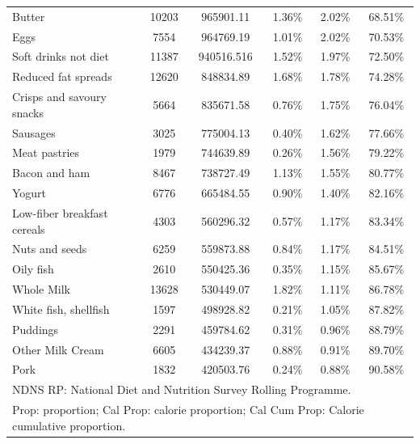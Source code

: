 \documentclass[utf8]{frontiersSCNS}
\providecommand{\DIFaddendFL}{} %
\DeclareRobustCommand{\DIFaddendFL}{\DIFOaddendFL \let\includegraphics\DIFOincludegraphics} %
\begin{document}
\begin{table}[h!]
{\begin{tabular}{lccccc}
        Butter                                              & 10203 & 965901.11  & 1.36\%        & 2.02\%   & 68.51\%      \\
        Eggs                                                & 7554  & 964769.19  & 1.01\%        & 2.02\%   & 70.53\%      \\
        Soft drinks not diet                                & 11387 & 940516.516 & 1.52\%        & 1.97\%   & 72.50\%      \\
        Reduced fat spreads                                 & 12620 & 848834.89  & 1.68\%        & 1.78\%   & 74.28\%      \\
        Crisps and savoury snacks                           & 5664  & 835671.58  & 0.76\%        & 1.75\%   & 76.04\%      \\
        Sausages                                            & 3025  & 775004.13  & 0.40\%        & 1.62\%   & 77.66\%      \\
        Meat pastries                                       & 1979  & 744639.89  & 0.26\%        & 1.56\%   & 79.22\%      \\
        Bacon and ham                                       & 8467  & 738727.49  & 1.13\%        & 1.55\%   & 80.77\%      \\
        Yogurt                                              & 6776  & 665484.55  & 0.90\%        & 1.40\%   & 82.16\%      \\
        Low-fiber breakfast cereals                         & 4303  & 560296.32  & 0.57\%        & 1.17\%   & 83.34\%      \\
        Nuts and seeds                                      & 6259  & 559873.88  & 0.84\%        & 1.17\%   & 84.51\%      \\
        Oily fish                                           & 2610  & 550425.36  & 0.35\%        & 1.15\%   & 85.67\%      \\
        Whole Milk                                          & 13628 & 530449.07  & 1.82\%        & 1.11\%   & 86.78\%      \\
        White fish, shellfish                               & 1597  & 498928.82  & 0.21\%        & 1.05\%   & 87.82\%      \\
        Puddings                                            & 2291  & 459784.62  & 0.31\%        & 0.96\%   & 88.79\%      \\
        Other Milk Cream                                    & 6605  & 434239.37  & 0.88\%        & 0.91\%   & 89.70\%      \\
        Pork                                                & 1832  & 420503.76  & 0.24\%        & 0.88\%   & 90.58\%     \\\hline
        \multicolumn{6}{l}{NDNS RP: National Diet and Nutrition Survey Rolling Programme.}\\
        \multicolumn{6}{l}{Prop: proportion; Cal Prop: calorie proportion; Cal Cum Prop: Calorie cumulative proportion.}
    \end{tabular}
        }
\DIFaddendFL \end{table}
\end{document}
